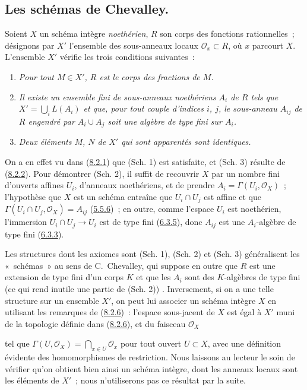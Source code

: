 \subsection{Les schémas de Chevalley.}
\label{subsection:I.8.3-fr}

\begin{env}[8.3.1]
\label{I.8.3.1-fr}
Soient $X$ un schéma intègre \emph{noethérien}, $R$ son corps des fonctions
rationnelles~; désignons par $X'$ l'ensemble des sous-anneaux locaux
$\mathscr{O}_x\subset R$, où $x$ parcourt $X$. L'ensemble $X'$ vérifie les
trois conditions suivantes~:
\begin{enumerate}
  \item[(Sch. 1)] \emph{Pour tout $M\in X'$, $R$ est le corps des fractions
    de $M$.}
  \item[(Sch. 2)] \emph{Il existe un ensemble fini de sous-anneaux
    noethériens $A_i$ de $R$ tels que $X'=\bigcup_i L(A_i)$ et que, pour tout
    couple d'indices $i$, $j$, le sous-anneau $A_{ij}$ de $R$ engendré par
    $A_i\cup A_j$ soit une algèbre de type fini sur $A_i$.}
  \item[(Sch. 3)] \emph{Deux éléments $M$, $N$ de $X'$ qui sont apparentés
    sont identiques.}
\end{enumerate}
\end{env}

On a en effet vu dans (\hyperref[I.8.2.1-fr]{8.2.1}) que (Sch. 1) est
satisfaite, et (Sch. 3) résulte de (\hyperref[I.8.2.2-fr]{8.2.2}). Pour
démontrer (Sch. 2), il suffit de recouvrir $X$ par un nombre fini d'ouverts
affines $U_i$, d'anneaux noethériens, et de prendre
$A_i=\Gamma(U_i,\mathscr{O}_X)$~; l'hypothèse que $X$ est un schéma entraîne
que $U_i\cap U_j$ est affine et que
$\Gamma(U_i\cap U_j,\mathscr{O}_X)=A_{ij}$
(\hyperref[I.5.5.6-fr]{5.5.6})~; en outre, comme l'espace $U_i$ est
noethérien, l'immersion $U_i\cap U_j\to U_i$ est de type fini
(\hyperref[I.6.3.5-fr]{6.3.5}), donc $A_{ij}$ est une $A_i$-algèbre de type
fini (\hyperref[I.6.3.3-fr]{6.3.3}).

\begin{env}[8.3.2]
\label{I.8.3.2-fr}
Les structures dont les axiomes sont (Sch. 1), (Sch. 2) et (Sch. 3)
généralisent les «~schémas~» au sens de C.~Chevalley, qui suppose en outre que
$R$ est une extension de type fini d'un corps $K$ et que les $A_i$ sont des
$K$-algèbres de type fini (ce qui rend inutile une partie de (Sch. 2))
\cite{I-1}. Inversement, si on a une telle structure sur un ensemble $X'$,
on peut lui associer un schéma intègre $X$ en utilisant les remarques de
(\hyperref[I.8.2.6-fr]{8.2.6})~: l'espace sous-jacent de $X$ est égal à $X'$
muni de la topologie définie dans (\hyperref[I.8.2.6-fr]{8.2.6}), et du
faisceau $\mathscr{O}_X$

tel que $\Gamma(U,\mathscr{O}_X)=\bigcap_{x\in U}\mathscr{O}_x$ pour tout
ouvert $U\subset X$, avec une définition évidente des homomorphismes de
restriction. Nous laissons au lecteur le soin de vérifier qu'on obtient bien
ainsi un schéma intègre, dont les anneaux locaux sont les éléments de $X'$~;
nous n'utiliserons pas ce résultat par la suite.
\end{env}
